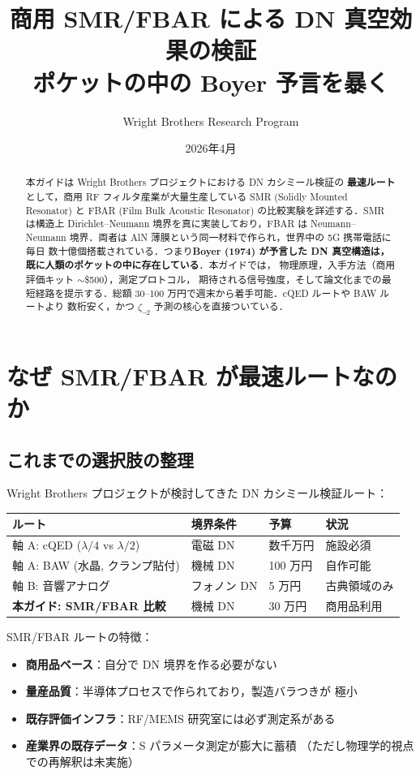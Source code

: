 \documentclass[11pt,a4paper]{article}
\title{商用 SMR/FBAR による DN 真空効果の検証\\
\large ポケットの中の Boyer 予言を暴く}
\author{Wright Brothers Research Program}
\date{2026年4月}
\begin{document}
\maketitle

\begin{abstract}
本ガイドは Wright Brothers プロジェクトにおける DN カシミール検証の
\textbf{最速ルート}として，商用 RF フィルタ産業が大量生産している
SMR (Solidly Mounted Resonator) と FBAR (Film Bulk Acoustic
Resonator) の比較実験を詳述する．SMR は構造上 Dirichlet--Neumann
境界を真に実装しており，FBAR は Neumann--Neumann 境界．両者は
AlN 薄膜という同一材料で作られ，世界中の 5G 携帯電話に毎日
数十億個搭載されている．つまり\textbf{Boyer (1974) が予言した
DN 真空構造は，既に人類のポケットの中に存在している}．本ガイドでは，
物理原理，入手方法（商用評価キット $\sim$\$500），測定プロトコル，
期待される信号強度，そして論文化までの最短経路を提示する．総額
30--100 万円で週末から着手可能．cQED ルートや BAW ルートより
数桁安く，かつ $\zeta_{\neg 2}$ 予測の核心を直接ついている．
\end{abstract}

\tableofcontents

\newpage
\section{なぜ SMR/FBAR が最速ルートなのか}

\subsection{これまでの選択肢の整理}

Wright Brothers プロジェクトが検討してきた DN カシミール検証ルート：

\begin{center}
\begin{tabular}{llll}
\toprule
ルート & 境界条件 & 予算 & 状況 \\
\midrule
軸 A: cQED ($\lambda/4$ vs $\lambda/2$) & 電磁 DN & 数千万円 & 施設必須 \\
軸 A: BAW (水晶, クランプ貼付) & 機械 DN & 100 万円 & 自作可能 \\
軸 B: 音響アナログ & フォノン DN & 5 万円 & 古典領域のみ \\
\textbf{本ガイド: SMR/FBAR 比較} & 機械 DN & 30 万円 & 商用品利用 \\
\bottomrule
\end{tabular}
\end{center}

SMR/FBAR ルートの特徴：
\begin{itemize}
\item \textbf{商用品ベース}：自分で DN 境界を作る必要がない
\item \textbf{量産品質}：半導体プロセスで作られており，製造バラつきが
極小
\item \textbf{既存評価インフラ}：RF/MEMS 研究室には必ず測定系がある
\item \textbf{産業界の既存データ}：S パラメータ測定が膨大に蓄積
（ただし物理学的視点での再解釈は未実施）
\end{itemize}
\end{document}
